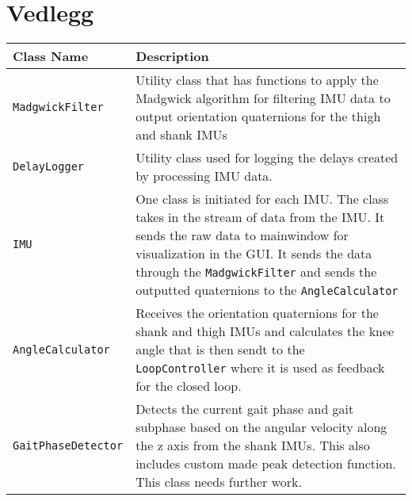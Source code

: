 
\section{Vedlegg}

  

\begin{table}[H]
\centering
\renewcommand{\arraystretch}{1.3} %
\begin{tcolorbox}[
    colback=white,      %
    colframe=black,     %
    arc=3mm,            %
    boxrule=0.5mm,      %
    width=\textwidth,   %
    halign=center       %
]
\begin{tabular}{p{} | p{}} %
\textbf{Class Name} & \textbf{Description} \\ \hline
\texttt{MadgwickFilter} & Utility class that has functions to apply the Madgwick algorithm for filtering IMU data to output orientation quaternions for the thigh and shank IMUs \\

\texttt{DelayLogger} & Utility class used for logging the delays created by processing IMU data. \\

\texttt{IMU} & One class is initiated for each IMU. The class takes in the stream of data from the IMU. It sends the raw data to mainwindow for visualization in the GUI. It sends the data through the \texttt{MadgwickFilter} and sends the outputted quaternions to the \texttt{AngleCalculator} \\

\texttt{AngleCalculator} & Receives the orientation quaternions for the shank and thigh IMUs and calculates the knee angle that is then sendt to the \texttt{LoopController} where it is used as feedback for the closed loop.\\

\texttt{GaitPhaseDetector} & Detects the current gait phase and gait subphase based on the angular velocity along the z axis from the shank IMUs. This also includes custom made peak detection function. This class needs further work. \\


\end{tabular}
\end{tcolorbox}
\end{table}
